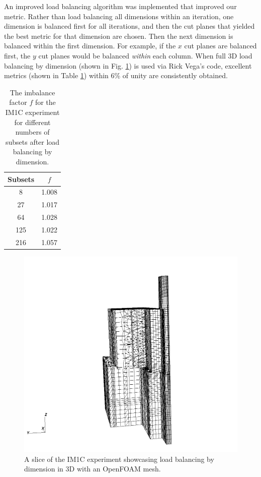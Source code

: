 \documentclass[11pt, letterpaper,titlepage,oneside]{article}
\begin{document}
An improved load balancing algorithm was implemented that improved our metric. Rather than load balancing all dimensions within an iteration, one dimension is balanced first for all iterations, and then the cut planes that yielded the best metric for that dimension are chosen. Then the next dimension is balanced within the first dimension. For example, if the $x$ cut planes are balanced first, the $y$ cut planes would be balanced \textit{within} each column. When full 3D load balancing by dimension (shown in Fig. \ref{lbd}) is used via Rick Vega's code, excellent metrics (shown in Table \ref{lbd_f}) within 6\% of unity are consistently obtained.

\begin{table}[H]
\centering
\begin{tabular}{c c}
   \textbf{Subsets} & \textbf{$f$} \\
   \hline
   8 & 1.008 \\
  27 & 1.017 \\
  64 & 1.028 \\
 125 & 1.022 \\
 216 & 1.057 \\
\hline
\end{tabular}
\caption{The imbalance factor $f$ for the IM1C experiment for different numbers of subsets after load balancing by dimension.}
\label{lbd_f}
\end{table}

\begin{figure}[H]
\centering
\includegraphics[scale=0.5]{../figures/im1_foam_448.png}
\caption{A slice of the IM1C experiment showcasing load balancing by dimension in 3D with an OpenFOAM mesh.}
\label{lbd}
\end{figure}
\end{document}
